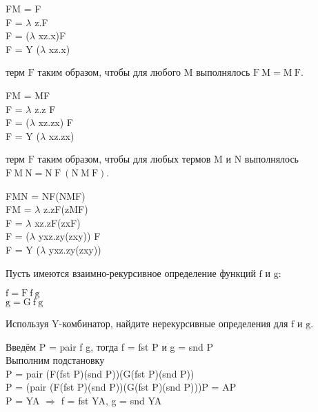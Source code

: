 \documentclass[a4paper,12pt]{article} %
\begin{document}
\begin{enumerate}
\begin{itemize}
			FM = F \\
			F = $\lambda$ z.F \\
			F = ($\lambda$ xz.x)F \\
			F = $\bm{\mathrm{Y}}$ ($\lambda$ xz.x)

		{\item терм $\mathrm{F}$ таким образом, чтобы для любого $\mathrm{M}$ выполнялось $\mathrm{F \ M = M \ F}$.}

			FM = MF \\
			F = $\lambda$ z.z F \\
			F = ($\lambda$ xz.zx) F \\
			F = $\bm{\mathrm{Y}}$ ($\lambda$ xz.zx)

		{\item терм $\mathrm{F}$ таким образом, чтобы для любых термов $\mathrm{M}$ и $\mathrm{N}$ выполнялось $\mathrm{F \ M \ N = N \ F \ (N \ M \ F)}$.}

			FMN = NF(NMF) \\
			FM = $\lambda$ z.zF(zMF) \\
			F = $\lambda$ xz.zF(zxF) \\
			F = ($\lambda$ yxz.zy(zxy)) F \\
			F = $\bm{\mathrm{Y}}$ ($\lambda$ yxz.zy(zxy))

	\end{itemize}%

{\item Пусть имеются взаимно-рекурсивное определение функций $\mathrm{f}$ и $\mathrm{g}$:
	\begin{center}
		$\mathrm{f = F \ f \ g}$ \\
		$\mathrm{g = G \ f \ g}$
	\end{center}
Используя Y-комбинатор, найдите нерекурсивные определения для $\mathrm{f}$ и $\mathrm{g}$.
}

	Введём P = pair f g, тогда f = fst P и g = snd P\\
	Выполним подстановку\\
	P = pair (F(fst P)(snd P))(G(fst P)(snd P)) \\
	P = (pair (F(fst P)(snd P))(G(fst P)(snd P)))P = AP \\
	P = YA $\Rightarrow$ f = fst YA, g = snd YA

\end{enumerate}
\end{document}
